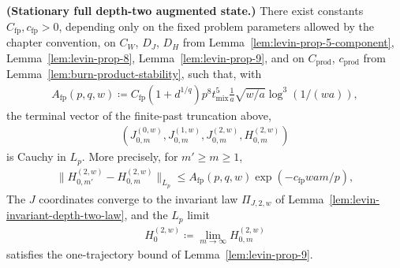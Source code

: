 \begin{lemma}\label{lem:finite-past-full-augmented-state}
  \textbf{(Stationary full depth-two augmented state.)}
  There exist constants \(C_{\text{fp}}, c_{\text{fp}} > 0\), depending only on the fixed
  problem parameters allowed by the chapter convention, on \(C_W\), \(D_J\), \(D_H\)
  from Lemma~\ref{lem:levin-prop-5-component}, Lemma~\ref{lem:levin-prop-8}, Lemma~\ref{lem:levin-prop-9}, and on
  \(C_{\text{prod}}\), \(c_{\text{prod}}\) from Lemma~\ref{lem:burn-product-stability}, such that, with
\begin{equation}
\begin{aligned}
  A_{\text{fp}}(p,q,w)
    \coloneqq C_{\text{fp}} (1 + d^{1 / q}) p^8 t_{\text{mix}}^5
       \frac{1}{a} \sqrt{w / a} \log^3(1 / (w a)),
\end{aligned}
\end{equation}
  the terminal vector of the finite-past truncation above,
\begin{equation}
\begin{aligned}
  (J_{0,m}^{(0,w)}, J_{0,m}^{(1,w)}, J_{0,m}^{(2,w)},
   H_{0,m}^{(2,w)})
\end{aligned}
\end{equation}
  is Cauchy in \(L_p\). More precisely, for \(m' \ge m \ge 1\),
\begin{equation}
\begin{aligned}
  \lVert  H_{0,m'}^{(2,w)} - H_{0,m}^{(2,w)}  \rVert_{L_p}
    \le A_{\text{fp}}(p,q,w) \exp(-c_{\text{fp}} w a m / p),
\end{aligned}
\label{eq:finite-past-H2-cauchy}
\end{equation}
  The \(J\) coordinates converge to the invariant law
  \(\Pi_{J,2,w}\) of Lemma~\ref{lem:levin-invariant-depth-two-law}, and the \(L_p\) limit
\begin{equation}
\begin{aligned}
H_0^{(2,w)} \coloneqq \lim_{m \to \infty} H_{0,m}^{(2,w)}
\end{aligned}
\end{equation}
  satisfies the one-trajectory bound of Lemma~\ref{lem:levin-prop-9}.
\end{lemma}

